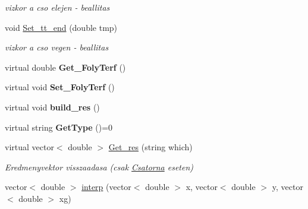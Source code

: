 \begin{DoxyCompactItemize}
\begin{DoxyCompactList}\small\item\em vizkor a cso elejen -\/ beallitas \end{DoxyCompactList}\item 
void \hyperlink{class_agelem_a9ff9bdd8cfd642c697cde656576315a6}{Set\+\_\+tt\+\_\+end} (double tmp)\hypertarget{class_agelem_a9ff9bdd8cfd642c697cde656576315a6}{}\label{class_agelem_a9ff9bdd8cfd642c697cde656576315a6}

\begin{DoxyCompactList}\small\item\em vizkor a cso vegen -\/ beallitas \end{DoxyCompactList}\item 
virtual double {\bfseries Get\+\_\+\+Foly\+Terf} ()\hypertarget{class_agelem_a0b858ef17c27b14b60c29404be67e486}{}\label{class_agelem_a0b858ef17c27b14b60c29404be67e486}

\item 
virtual void {\bfseries Set\+\_\+\+Foly\+Terf} ()\hypertarget{class_agelem_a52bbebe64a09fb4e96e870cd7dfc5fc7}{}\label{class_agelem_a52bbebe64a09fb4e96e870cd7dfc5fc7}

\item 
virtual void {\bfseries build\+\_\+res} ()\hypertarget{class_agelem_ac79eb4da65122b22558f66b8e4e8231b}{}\label{class_agelem_ac79eb4da65122b22558f66b8e4e8231b}

\item 
virtual string {\bfseries Get\+Type} ()=0\hypertarget{class_agelem_a0b648fe896fb1c2abdbb30023ddb3f5d}{}\label{class_agelem_a0b648fe896fb1c2abdbb30023ddb3f5d}

\item 
virtual vector$<$ double $>$ \hyperlink{class_agelem_ad31d35680f3bb4941f4a68d6f208a2d7}{Get\+\_\+res} (string which)\hypertarget{class_agelem_ad31d35680f3bb4941f4a68d6f208a2d7}{}\label{class_agelem_ad31d35680f3bb4941f4a68d6f208a2d7}

\begin{DoxyCompactList}\small\item\em Eredmenyvektor visszaadasa (csak \hyperlink{class_csatorna}{Csatorna} eseten) \end{DoxyCompactList}\item 
vector$<$ double $>$ \hyperlink{class_agelem_a2bf7db59960759d324cbef9632ca7df8}{interp} (vector$<$ double $>$ x, vector$<$ double $>$ y, vector$<$ double $>$ xg)\hypertarget{class_agelem_a2bf7db59960759d324cbef9632ca7df8}{}\label{class_agelem_a2bf7db59960759d324cbef9632ca7df8}


\end{DoxyCompactItemize}
